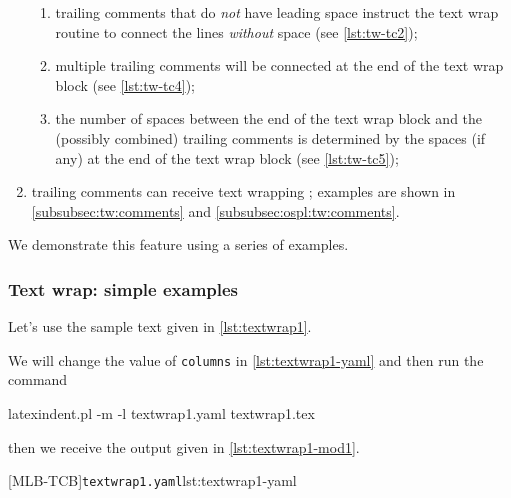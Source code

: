\documentclass[10pt]{article}
\begin{document}
\begin{enumerate}
\begin{enumerate}
         \item trailing comments that do \emph{not} have leading space instruct the text
               wrap routine to connect the lines \emph{without} space (see
               \cref{lst:tw-tc2});
         \item multiple trailing comments will be connected at the end of the text wrap
               block (see \cref{lst:tw-tc4});
         \item the number of spaces between the end of the text wrap block and the
               (possibly combined) trailing comments is determined by the spaces (if any)
               at the end of the text wrap block (see \cref{lst:tw-tc5});
        \end{enumerate}
  \item trailing comments can receive text wrapping ; examples are shown in \cref{subsubsec:tw:comments} and
        \cref{subsubsec:ospl:tw:comments}.
 \end{enumerate}

 We demonstrate this feature using a series of examples.

\subsubsection{Text wrap: simple examples}\label{subsec:textwrapping-quick-start}

 \begin{example}
 Let's use the sample text given in \cref{lst:textwrap1}. 


 We will change the value of \texttt{columns} in \cref{lst:textwrap1-yaml} and then run
 the command

 \begin{commandshell}
latexindent.pl -m -l textwrap1.yaml textwrap1.tex
\end{commandshell}

 then we receive the output given in \cref{lst:textwrap1-mod1}.

 \begin{cmhtcbraster}[raster column skip=.1\linewidth]
  [MLB-TCB]{\texttt{textwrap1.yaml}}{lst:textwrap1-yaml}
 \end{cmhtcbraster}
 \end{example}
\end{document}
